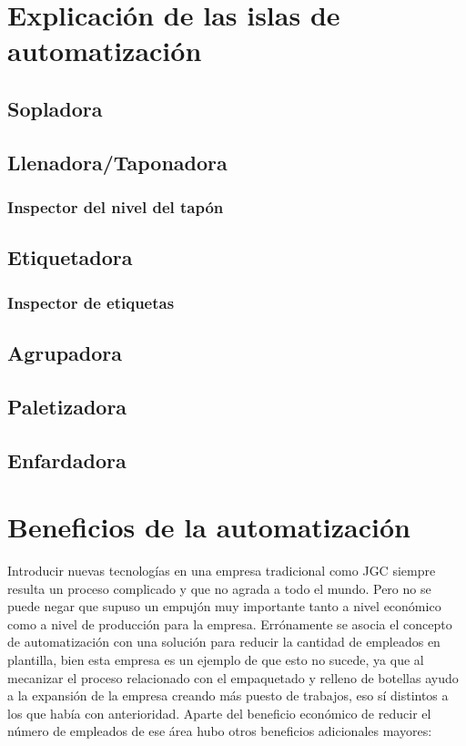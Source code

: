 \documentclass[11pt,a4paper,spanish,twoside]{report}
\begin{document}
\chapter{Explicación de las islas de automatización}
\section{Sopladora}
\section{Llenadora/Taponadora}
\subsection{Inspector del nivel del tapón}
\section{Etiquetadora}
\subsection{Inspector de etiquetas}
\section{Agrupadora}
\section{Paletizadora}
\section{Enfardadora}
\chapter{Beneficios de la automatización}
Introducir nuevas tecnologías en una empresa tradicional como JGC siempre
resulta un proceso complicado y que no agrada a todo el mundo. Pero no se
puede negar que supuso un empujón muy importante tanto a nivel económico como
a nivel de producción para la empresa. Errónamente se asocia el concepto de
automatización con una solución para reducir la cantidad de empleados en
plantilla, bien esta empresa es un ejemplo de que esto no sucede, ya que al
mecanizar el proceso relacionado con el empaquetado y relleno de botellas
ayudo a la expansión de la empresa creando más puesto de trabajos, eso sí
distintos a los que había con anterioridad. Aparte del beneficio económico de
reducir el número de empleados de ese área hubo otros beneficios adicionales
mayores:
\end{document}
